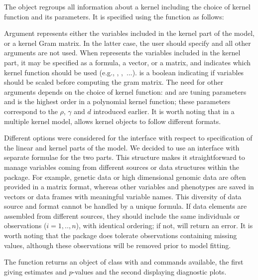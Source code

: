 The  object regroups all information about a kernel including the choice of kernel function and its parameters. It is specified using the  function as follows:


\begin{sloppypar}
Argument  represents either the variables included in the kernel part of the model, or a kernel Gram matrix. In the latter case, the user should specify  and all other arguments are not used. When  represents the variables included in the kernel part, it may be specified as a formula, a vector, or a matrix, and  indicates which kernel function should be used (e.g., , ,~...).  is a boolean indicating if variables should be scaled before computing the gram matrix. The need for other arguments depends on the choice of kernel function:  and  are tuning parameters and  is the highest order in a polynomial kernel function; these parameters correspond to the $\rho$, $\gamma$ and $d$ introduced earlier. It is worth noting that in a multiple kernel model,  allows kernel objects to follow different formats.
\end{sloppypar}


Different options were considered for the interface with respect to specification of the linear and kernel parts of the model. We decided to use an interface with separate formulae for the two parts. This structure makes it straightforward to manage variables coming from different sources or data structures within the package. For example, genetic data or high dimensional genomic data are often provided in a matrix format, whereas other variables and phenotypes are saved in vectors or data frames with meaningful variable names. This diversity of data source and format cannot be handled by a unique formula. If data elements are assembled from different sources, they should include the same individuals or observations ($i=1,..,n$), with identical ordering; if not,  will return an error. It is worth noting that the  package does tolerate observations containing missing values, although these observations will be removed prior to model fitting.


The function  returns an object of class  with  and  commands available, the first giving estimates and $p$-values and the second displaying diagnostic plots.


